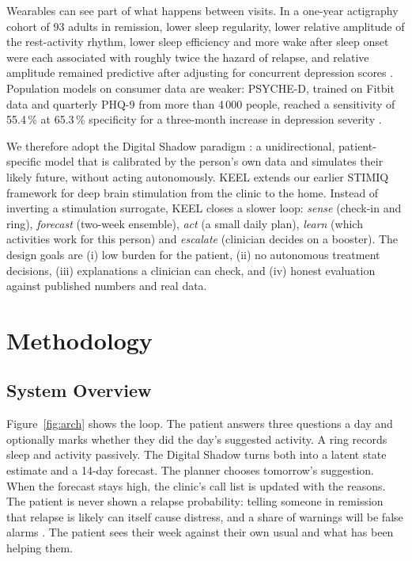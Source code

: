\documentclass[11pt,a4paper]{article}
\begin{document}
Wearables can see part of what happens between visits. In a one-year actigraphy cohort of 93 adults in remission, lower sleep regularity, lower relative amplitude of the rest-activity rhythm, lower sleep efficiency and more wake after sleep onset were each associated with roughly twice the hazard of relapse, and relative amplitude remained predictive after adjusting for concurrent depression scores \cite{tonon2026}. Population models on consumer data are weaker: PSYCHE-D, trained on Fitbit data and quarterly PHQ-9 from more than 4\,000 people, reached a sensitivity of 55.4\,\% at 65.3\,\% specificity for a three-month increase in depression severity \cite{makhmutova2022}.

We therefore adopt the Digital Shadow paradigm \cite{niederer2021}: a unidirectional, patient-specific model that is calibrated by the person's own data and simulates their likely future, without acting autonomously. KEEL extends our earlier STIMIQ framework for deep brain stimulation \cite{laakso2026} from the clinic to the home. Instead of inverting a stimulation surrogate, KEEL closes a slower loop: \emph{sense} (check-in and ring), \emph{forecast} (two-week ensemble), \emph{act} (a small daily plan), \emph{learn} (which activities work for this person) and \emph{escalate} (clinician decides on a booster). The design goals are (i) low burden for the patient, (ii) no autonomous treatment decisions, (iii) explanations a clinician can check, and (iv) honest evaluation against published numbers and real data.

\section{Methodology}

\subsection{System Overview}

Figure~\ref{fig:arch} shows the loop. The patient answers three questions a day and optionally marks whether they did the day's suggested activity. A ring records sleep and activity passively. The Digital Shadow turns both into a latent state estimate and a 14-day forecast. The planner chooses tomorrow's suggestion. When the forecast stays high, the clinic's call list is updated with the reasons. The patient is never shown a relapse probability: telling someone in remission that relapse is likely can itself cause distress, and a share of warnings will be false alarms \cite{coenen2025}. The patient sees their week against their own usual and what has been helping them.
\end{document}
